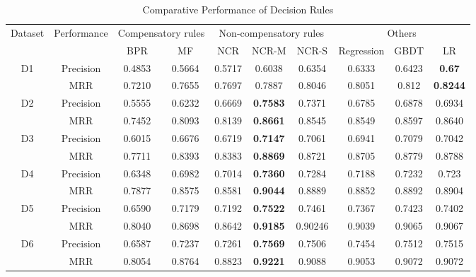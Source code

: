 \documentclass[sigconf]{acmart}
\begin{document}
\begin{table*}[htbp]
\caption{Comparative Performance of Decision Rules }
\label{tab:decision}
\begin{tabular}{|c|c|c|c|c|c|c|c|c|c|}
\hline
\multirow{2}{*}{Dataset} & \multirow{2}{*}{Performance}
& \multicolumn{2}{|c|}{Compensatory rules} & \multicolumn{3}{|c|}{Non-compensatory rules} & \multicolumn{3}{|c|}{Others} \\
\cline{3-10} & & BPR & MF & NCR & NCR-M & NCR-S & Regression & GBDT & LR \\\hline
\multirow{2}{*}{D1} &Precision	&0.4853	 & 0.5664&	0.5717 & 0.6038 & 0.6354 &	0.6333 & 0.6423 &\bf{0.67}\\
\cline{2-10}	    &MRR		& 0.7210&0.7655 &0.7697 & 0.7887 & 0.8046 &0.8051 & 0.812	 &\bf{0.8244}\\\hline
\multirow{2}{*}{D2} &Precision  &0.5555 &0.6232 &0.6669 & \bf{0.7583} & 0.7371 &	0.6785 & 0.6878	& 0.6934\\
\cline{2-10}		 &MRR		& 0.7452& 0.8093&	0.8139 &\bf{0.8661} & 0.8545 & 0.8549 & 0.8597	& 0.8640\\\hline
\multirow{2}{*}{D3} &Precision & 0.6015&0.6676 & 0.6719 & \bf{0.7147} & 0.7061 &	0.6941 & 0.7079 & 0.7042\\
\cline{2-10} 		&MRR		& 0.7711&0.8393 & 0.8383 &\bf{0.8869} & 0.8721 & 0.8705 &0.8779 & 0.8788\\\hline
\multirow{2}{*}{D4} &Precision & 0.6348&0.6982 & 0.7014 & \bf{0.7360} & 0.7284 & 0.7188 & 0.7232 & 0.723\\
\cline{2-10} 		&MRR		& 0.7877& 0.8575& 0.8581& \bf{0.9044} & 0.8889 &	0.8852 & 0.8892& 0.8904\\\hline
\multirow{2}{*}{D5} &Precision	& 0.6590&0.7179&	0.7192 &\bf{0.7522} &0.7461 & 0.7367 & 0.7423 &0.7402\\
\cline{2-10}		 &MRR		& 0.8040&0.8698& 0.8642 &\bf{0.9185} & 0.90246 & 0.9039 &	0.9065 & 0.9067\\\hline
\multirow{2}{*}{D6} &Precision	& 0.6587&0.7237& 0.7261 &\bf{0.7569} & 0.7506 & 0.7454 & 0.7512 & 0.7515\\
\cline{2-10}   		&MRR		&0.8054 &0.8764&	0.8823& \bf{0.9221} &	0.9088 & 0.9053 & 0.9072 & 0.9072\\\hline
\end{tabular}
\end{table*}
\end{document}
